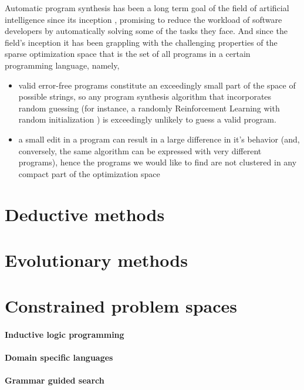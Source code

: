 Automatic program synthesis has been a long term goal of the field of artificial intelligence since its inception \cite{mannaAutomaticProgramSynthesis1971}, promising to reduce the workload of software developers by automatically solving some of the tasks they face.
And since the field's inception it has been grappling with the challenging properties of the sparse optimization space that is the set of all programs in a certain programming language, namely, 
\begin{itemize}
    \item valid error-free programs constitute an exceedingly small part of the space of possible strings, so any program synthesis algorithm that incorporates random guessing (for instance, a randomly Reinforcement Learning with random initialization \cite{suttonReinforcementLearningSecond2018}) is exceedingly unlikely to guess a valid program.
    \item a small edit in a program can result in a large difference in it's behavior (and, conversely, the same algorithm can be expressed with very different programs), hence the programs we would like to find are not clustered in any compact part of the optimization space
\end{itemize}

\section{Deductive methods}

\newpage
\section{Evolutionary methods}

\newpage
\section{Constrained problem spaces}

\paragraph{Inductive logic programming}

\paragraph{Domain specific languages}

\paragraph{Grammar guided search}

